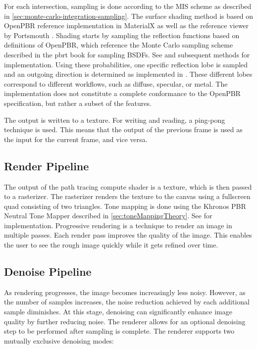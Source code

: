 For each intersection, sampling is done according to the \gls{MIS} scheme as described in \autoref{sec:monte-carlo-integration-sampling}. The surface shading method is based on \gls{OpenPBR} reference implementation in \gls{MaterialX} as well as the reference viewer by Portsmouth \cite{openPbrViewer}. Shading starts by sampling the reflection functions based on definitions of \gls{OpenPBR}, which reference the Monte Carlo sampling scheme described in the \gls{pbrt} book \cite{Pharr_Physically_Based_Rendering_2023} for sampling \glspl{BSDF}. See  and subsequent methods for implementation. Using these probabilities, one specific reflection lobe is sampled and an outgoing direction is determined as implemented in . These different lobes correspond to different workflows, such as diffuse, specular, or metal. The implementation does not constitute a complete conformance to the \gls{OpenPBR} specification, but rather a subset of the features.

The output is written to a texture. For writing and reading, a ping-pong technique is used. This means that the output of the previous frame is used as the input for the current frame, and vice versa.

\subsection*{Render Pipeline}

The output of the path tracing compute shader is a texture, which is then passed to a rasterizer. The rasterizer renders the texture to the canvas using a fullscreen quad consisting of two triangles. Tone mapping is done using the Khronos \gls{PBR} Neutral Tone Mapper described in \autoref{sec:toneMappingTheory}. See  for implementation. Progressive rendering is a technique to render an image in multiple passes. Each render pass improves the quality of the image. This enables the user to see the rough image quickly while it gets refined over time.

\subsection*{Denoise Pipeline}

As rendering progresses, the image becomes increasingly less noisy. However, as the number of samples increases, the noise reduction achieved by each additional sample diminishes. At this stage, denoising can significantly enhance image quality by further reducing noise. The renderer allows for an optional denoising step to be performed after sampling is complete. The renderer supports two mutually exclusive denoising modes:

